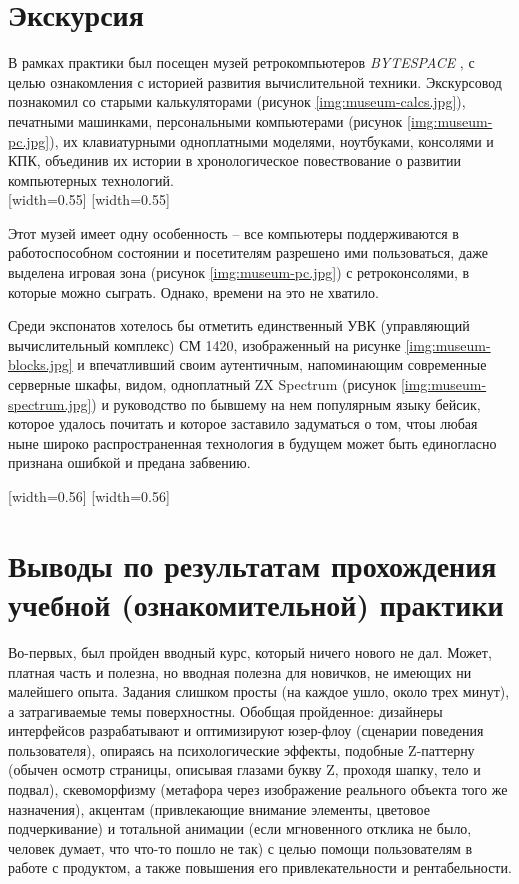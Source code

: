 \documentclass[variant=practice]{bsuir}
\begin{document}
\chapter{Экскурсия}

В рамках практики был посещен музей ретрокомпьютеров \textit{BYTESPACE}
, с целью ознакомления с историей
развития вычислительной техники. Экскурсовод познакомил со старыми
калькуляторами (рисунок \ref{img:museum-calcs.jpg}), печатными машинками,
персональными компьютерами (рисунок \ref{img:museum-pc.jpg}), их клавиатурными
одноплатными моделями, ноутбуками, консолями и КПК, объединив их истории в
хронологическое повествование о развитии компьютерных технологий.\\

[width=0.55\textwidth]
[width=0.55\textwidth]

Этот музей имеет одну особенность -- все компьютеры поддерживаются в
работоспособном состоянии и посетителям разрешено ими пользоваться, даже
выделена игровая зона (рисунок \ref{img:museum-pc.jpg}) с ретроконсолями, в
которые можно сыграть. Однако, времени на это не хватило.

Среди экспонатов хотелось бы отметить единственный УВК (управляющий
вычислительный комплекс) СМ 1420, изображенный на рисунке
\ref{img:museum-blocks.jpg} и впечатливший своим аутентичным, напоминающим
современные серверные шкафы, видом, одноплатный ZX Spectrum (рисунок
\ref{img:museum-spectrum.jpg}) и руководство по бывшему на нем популярным языку
бейсик, которое удалось почитать и которое заставило задуматься о том, чтоы
любая ныне широко распространенная технология в будущем может быть единогласно
признана ошибкой и предана забвению.

[width=0.56\textwidth]
[width=0.56\textwidth]

\chapter*{Выводы по результатам прохождения учебной (ознакомительной) практики}

Во-первых, был пройден вводный курс, который ничего нового не дал. Может,
платная часть и полезна, но вводная полезна для новичков, не имеющих ни
малейшего опыта. Задания слишком просты (на каждое ушло, около трех минут), а
затрагиваемые темы поверхностны. Обобщая пройденное: дизайнеры интерфейсов
разрабатывают и оптимизируют юзер-флоу (сценарии поведения пользователя),
опираясь на психологические эффекты, подобные Z-паттерну (обычен осмотр
страницы, описывая глазами букву Z, проходя шапку, тело и подвал), скевоморфизму
(метафора через изображение реального объекта того же назначения), акцентам
(привлекающие внимание элементы, цветовое подчеркивание) и тотальной анимации
(если мгновенного отклика не было, человек думает, что что-то пошло не так) с
целью помощи пользователям в работе с продуктом, а также повышения его
привлекательности и рентабельности.
\end{document}

